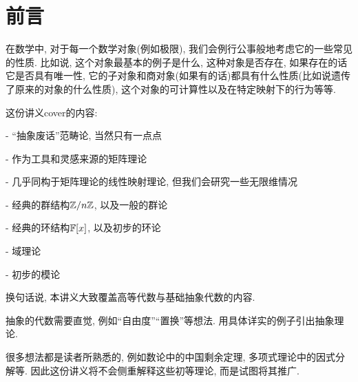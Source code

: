 \chapter*{前言}

在数学中, 对于每一个数学对象(例如极限), 我们会例行公事般地考虑它的一些常见的性质. 比如说, 这个对象最基本的例子是什么, 这种对象是否存在, 如果存在的话它是否具有唯一性, 它的子对象和商对象(如果有的话)都具有什么性质(比如说遗传了原来的对象的什么性质), 这个对象的可计算性以及在特定映射下的行为等等.




这份讲义cover的内容: 

- “抽象废话”范畴论, 当然只有一点点

- 作为工具和灵感来源的矩阵理论

- 几乎同构于矩阵理论的线性映射理论, 但我们会研究一些无限维情况

- 经典的群结构$\mathbb{Z} / n\mathbb{Z}$, 以及一般的群论

- 经典的环结构$\mathbb{F} [x]$, 以及初步的环论

- 域理论

- 初步的模论

换句话说, 本讲义大致覆盖高等代数与基础抽象代数的内容. 





抽象的代数需要直觉, 例如“自由度”“置换”等想法. 用具体详实的例子引出抽象理论. 


很多想法都是读者所熟悉的, 例如数论中的中国剩余定理, 多项式理论中的因式分解等. 因此这份讲义将不会侧重解释这些初等理论, 而是试图将其推广. 


